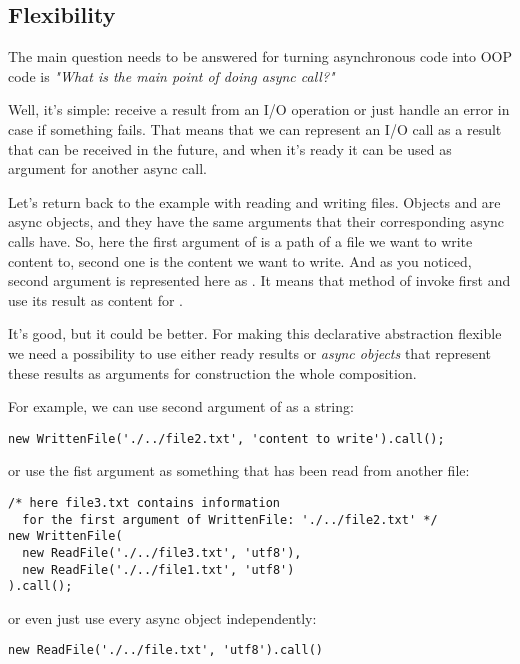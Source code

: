 \documentclass{article}
\newcommand{\cit}[1]{{\fontfamily{qcr}\selectfont{\textit{\textbf{\textcolor{darkgray}{#1}}}}}}
\begin{document}
\subsection{Flexibility}

The main question needs to be answered for turning asynchronous code into OOP code is \textit{"What is the main point of doing async call?"}

Well, it's simple: receive a result from an I/O operation or just handle an error in case if something fails. That means that we can represent an I/O call as a result that can be received in the future, and when it's ready it can be used as argument for another async call.

Let's return back to the example with reading and writing files. Objects \cit{WrittenFile} and \cit{ReadContentFromFile} are async objects, and they have the same arguments that their corresponding async calls have. So, here the first argument of \cit{WrittenFile} is a path of a file we want to write content to, second one is the content we want to write. And as you noticed, second argument is represented here as \cit{ReadContentFromFile}. It means that method \cit{call()} of \cit{WrittenFile} invoke first \cit{ReadContentFromFile} and use its result as content for \cit{WrittenFile}.

It's good, but it could be better. For making this declarative abstraction flexible we need a possibility to use either ready results or \textit{async objects} that represent these results as arguments for construction the whole composition.

For example, we can use second argument of \cit{WrittenFile} as a string:

\begin{lstlisting}
new WrittenFile('./../file2.txt', 'content to write').call();
\end{lstlisting}
or use the fist argument as something that has been read from another file:

\begin{lstlisting}
/* here file3.txt contains information 
  for the first argument of WrittenFile: './../file2.txt' */
new WrittenFile(
  new ReadFile('./../file3.txt', 'utf8'), 
  new ReadFile('./../file1.txt', 'utf8')
).call();
\end{lstlisting}
or even just use every async object independently:

\begin{lstlisting}
new ReadFile('./../file.txt', 'utf8').call()
\end{lstlisting}
\end{document}

